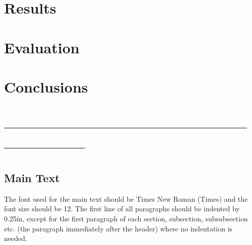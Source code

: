 \documentclass[12pt,a4paper]{article}
\begin{document}
\iffalse
#################################################################################
\fi

\section{Results}

\iffalse
this section presents the results of the solutions.  It should include information on experimental settings.  The results should demonstrate the claimed benefits/disadvantages of the proposed solutions.
This section should be between 2 to 3 pages in length.
\fi



\iffalse
#################################################################################
\fi

\section{Evaluation}

\iffalse
This section should between 1 to 2 pages in length.
\fi



\iffalse
#################################################################################
\fi

\section{Conclusions}

\iffalse
This section summarises the main points of this paper.  Do not replicate the abstract as the conclusion.  A conclusion might elaborate on the importance of the work or suggest applications and extensions.  This section should be no more than 1 page in length.
\fi



\iffalse
#################################################################################
\fi

\iffalse
\section*{------------------------------------------------------------}

\subsection{Main Text}

The font used for the main text should be Times New Roman (Times) and the font size should be 12.  The first line of all paragraphs should be indented by 0.25in, except for the first paragraph of each section, subsection, subsubsection etc. (the paragraph immediately after the header) where no indentation is needed.
\end{document}
